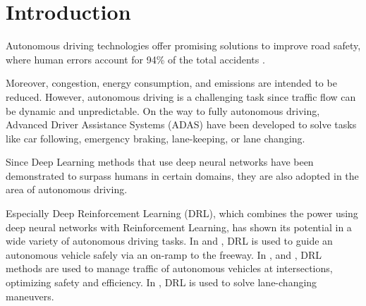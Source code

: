 \documentclass[review]{elsarticle}
\providecommand{\martinc}[1]{}                  %
\providecommand{\3}{{\ss}}
\begin{document}
	\section{Introduction}
	Autonomous driving technologies offer promising solutions to
	improve road safety, where human errors account for 94\% of the total
	accidents \citep{vehicleCrashSurvey2015}.  
	\martinc{Das ``author'' Attribut in Bibtex darf man nicht
		fuer anderes missbrauchen, da je nach Zitierstil nur zwei Autoren
		drankommen und bibtex diverse andere Manipulationen vornimmt; .bib
		File korrigiert.}
	\martinc{citep=cite with parentheses}
	Moreover, congestion, energy
	consumption, and emissions \martinc{Die Englaender haben bei
		Aufzaehlungen von $\ge 3$ items auch vor dem ``and'' ein Komma} are intended to be reduced. 
	However, autonomous driving is a challenging task
	since traffic flow can be dynamic and unpredictable.
	On the way to fully autonomous driving, Advanced Driver Assistance Systems
	(ADAS) have been developed to solve tasks like car following, emergency
	braking, lane-keeping, or lane changing. \martinc{``like'' startet
		bereits eine unvollst\"andige Aufz\"ahlung, so no need for ``etc.''}
	\martinc{Bindestriche in zusammengesetzten Worten gibt es i.A. nur bei 
		$\ge 3$ Teilen, und zwar in alle L\"ucken au\3er der letzten, also
		\emph{lane changing} aber \emph{lane-changing model}}
	Since Deep Learning methods that use deep neural networks have been demonstrated to surpass humans
	in certain domains, they are also adopted in the area of autonomous
	driving.
	\martinc{Generelles ueber which vs. that: 
		1. \emph{which mit Komma:}
		``non-defining clauses'': der darauf folgende Relativsatz gibt interessante Details,
		schraenkt das Subjekt/Objekt im Hauptsatz aber nicht ein (I use my bike, which has 18
		gears, rather often)
		2. \emph{which ohne Komma oder besser ``that'' oder ein Gerund (``ing-Form''):} ``defining clauses''. Der darauf folgende Relativsatz enthaelt einschraenkende,
		wesentliche Informationen: ``The bike that/which has a
		broken chain/having a broken chain is in the garage'' (impliziert,
		dass ich mindestens ein zweites Rad habe). Im Folgenden ist eine ``nice-to
		mention''-Definition, also ist which mit Komma OK, oft folgen bei dir dann
		aber defining clauses, die ich durch ``that'', ``who'' (bei Menschen)
		oder einem Gerund ersetzt habe. Pedantische Korrewktoren nennen das
		auch ``which hunting'' (witch=Hexe)}
	Especially Deep Reinforcement Learning (DRL), which combines the power
	using deep neural networks with Reinforcement Learning, has shown its potential in a wide variety of autonomous driving tasks. 
	In \cite{OnRampMerge2018} and \cite{OnRampMerge2020}, DRL is used to
	guide an autonomous vehicle safely via an on-ramp to the freeway. In \cite{intersection1}, \cite{intersection3} and \cite{intersection2}, DRL methods are used to manage traffic of autonomous vehicles at intersections, optimizing safety and efficiency.
	In \cite{LangeChange1}, DRL is used to solve lane-changing maneuvers.
	
\end{document}
